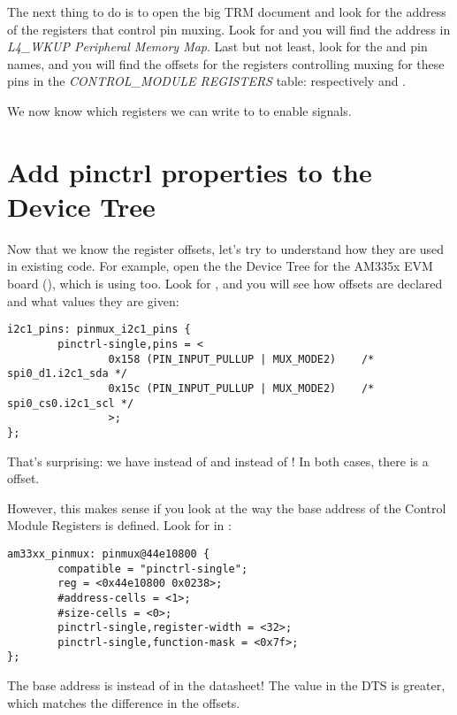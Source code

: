 The next thing to do is to open the big TRM document and look for the
address of the registers that control pin muxing. Look for
 and you will find the 
address in {\em L4\_WKUP Peripheral Memory Map}.
Last but not least, look for the  and  
pin names, and you will find the offsets for the registers controlling
muxing for these pins in the {\em CONTROL\_MODULE REGISTERS} table:
respectively  and .

We now know which registers we can write to to enable 
signals.

\section{Add pinctrl properties to the Device Tree}

Now that we know the register offsets, let's try to understand
how they are used in existing code. For example, open the
the Device Tree for the AM335x EVM board
(), which is using
 too. Look for , and you will see how
offsets are declared and what values they are given:

\begin{verbatim}
i2c1_pins: pinmux_i2c1_pins {
        pinctrl-single,pins = <
                0x158 (PIN_INPUT_PULLUP | MUX_MODE2)    /* spi0_d1.i2c1_sda */
                0x15c (PIN_INPUT_PULLUP | MUX_MODE2)    /* spi0_cs0.i2c1_scl */
                >;
};
\end{verbatim}

That's surprising: we have  instead of 
and  instead of ! In both cases, there is a
 offset.

However, this makes sense if you look at the way the base address of the 
Control Module Registers is defined. Look for  in
:

\begin{verbatim}
am33xx_pinmux: pinmux@44e10800 {
        compatible = "pinctrl-single";
        reg = <0x44e10800 0x0238>;
        #address-cells = <1>;
        #size-cells = <0>;
        pinctrl-single,register-width = <32>;
        pinctrl-single,function-mask = <0x7f>;
};
\end{verbatim}

The base address is  instead of  in
the datasheet! The value in the DTS is  greater, which
matches the difference in the offsets.

